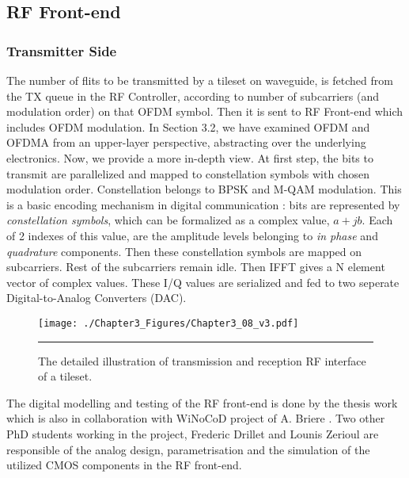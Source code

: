 \subsection{RF Front-end}

\subsubsection{Transmitter Side}

The number of flits to be transmitted by a tileset on waveguide, is fetched from the TX queue in the RF Controller, according to number of subcarriers (and modulation order) on that OFDM symbol. Then it is sent to RF Front-end which includes OFDM modulation. In Section 3.2, we have examined OFDM and OFDMA from an upper-layer perspective, abstracting over the underlying electronics. Now, we provide a more in-depth view. At first step, the bits to transmit are parallelized and mapped to constellation symbols with chosen modulation order. Constellation belongs to BPSK and M-QAM modulation. This is a basic encoding mechanism in digital communication : bits are represented by \textit{constellation symbols}, which can be formalized as a complex value, $a +jb$. Each of 2 indexes of this value, are the amplitude levels belonging to \textit{in phase} and \textit{quadrature} components. Then these constellation symbols are mapped on subcarriers. Rest of the subcarriers remain idle. Then IFFT gives a N element vector of complex values. These I/Q values are serialized and fed to two seperate Digital-to-Analog Converters (DAC). 

\begin{figure}[htbp]
  \centering
    \texttt{[image: ./Chapter3\_Figures/Chapter3\_08\_v3.pdf]}
    \rule{35em}{0.5pt}
  \caption[transmission and reception RF interface]{The detailed illustration of transmission and reception RF interface of a tileset.}
  \label{fig:Electron}
\end{figure}

The digital modelling and testing of the RF front-end is done by the thesis work which is also in collaboration with WiNoCoD project of A. Briere \cite{briere2015dynamically}. Two other PhD students working in the project, Frederic Drillet and Lounis Zerioul are responsible of the analog design, parametrisation and the simulation of the utilized CMOS components in the RF front-end. 

